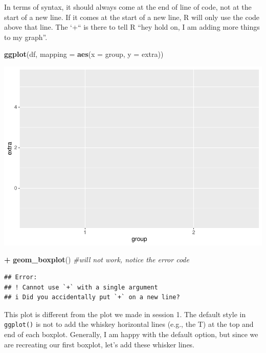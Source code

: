 \documentclass[
]{book}
\newenvironment{Shaded}{\begin{snugshade}}{\end{snugshade}}
\newcommand{\AttributeTok}[1]{\textcolor[rgb]{0.13,0.29,0.53}{#1}}
\newcommand{\CommentTok}[1]{\textcolor[rgb]{0.56,0.35,0.01}{\textit{#1}}}
\newcommand{\FunctionTok}[1]{\textcolor[rgb]{0.13,0.29,0.53}{\textbf{#1}}}
\newcommand{\NormalTok}[1]{#1}
\newcommand{\SpecialCharTok}[1]{\textcolor[rgb]{0.81,0.36,0.00}{\textbf{#1}}}
\begin{document}
In terms of syntax, it should always come at the end of line of code, not at the start of a new line. If it comes at the start of a new line, R will only use the code above that line. The `+`` is there to tell R ``hey hold on, I am adding more things to my graph''.

\begin{Shaded}
\begin{Highlighting}[]
\FunctionTok{ggplot}\NormalTok{(df, }\AttributeTok{mapping =} \FunctionTok{aes}\NormalTok{(}\AttributeTok{x =}\NormalTok{ group, }\AttributeTok{y =}\NormalTok{ extra))}
\end{Highlighting}
\end{Shaded}

\includegraphics{rintro_demo_files/figure-latex/unnamed-chunk-280-1.pdf}

\begin{Shaded}
\begin{Highlighting}[]
  \SpecialCharTok{+} \FunctionTok{geom\_boxplot}\NormalTok{() }\CommentTok{\#will not work, notice the error code}
\end{Highlighting}
\end{Shaded}

\begin{verbatim}
## Error:
## ! Cannot use `+` with a single argument
## i Did you accidentally put `+` on a new line?
\end{verbatim}

This plot is different from the plot we made in session 1. The default style in \texttt{ggplot()} is not to add the whiskey horizontal lines (e.g., the T) at the top and end of each boxplot. Generally, I am happy with the default option, but since we are recreating our first boxplot, let's add these whisker lines.
\end{document}
